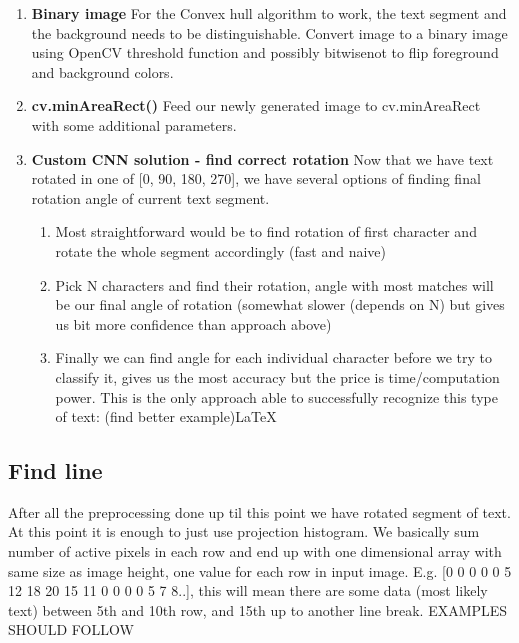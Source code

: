 \documentclass[Report.tex]{subfiles}
\begin{document}
\begin{flushleft}
  \begin{enumerate}
    \item \textbf{Binary image}
    For the Convex hull algorithm to work, the text segment and the background needs to be distinguishable. Convert image to a binary image using OpenCV threshold function and possibly bitwise\textunderscore not to flip foreground and background colors.
    \item \textbf{cv.minAreaRect()}
    Feed our newly generated image to cv.minAreaRect with some additional parameters.
    \item \textbf{Custom CNN solution - find correct rotation}
    Now that we have text rotated in one of [0\textdegree, 90\textdegree, 180\textdegree, 270\textdegree], we have several options of finding final rotation angle of current text segment. 
    \begin{enumerate}
	\item{Most straightforward would be to find rotation of first character and rotate the whole segment accordingly (fast and naive)}
	\item{Pick N characters and find their rotation, angle with most matches will be our final angle of rotation (somewhat slower (depends on N) but gives us bit more confidence than approach above)}
	\item{Finally we can find angle for each individual character before we try to classify it, gives us the most accuracy but the price is time/computation power. This is the only approach able to successfully recognize this type of text: (find better example)\LaTeX}
	\end{enumerate}
    \end{enumerate}
\end{flushleft}


\subsection{Find line}\label{subsec:Find_line}
After all the preprocessing done up til this point we have rotated segment of text. At this point it is enough to just use projection histogram. We basically sum number of active pixels in each row and end up with one dimensional array with same size as image height, one value for each row in input image.
E.g. [0 0 0 0 0 5 12 18 20 15 11 0 0 0 0 5 7 8..], this will mean there are some data (most likely text) between 5th and 10th row, and 15th  up to another line break. EXAMPLES SHOULD FOLLOW 
\end{document}
